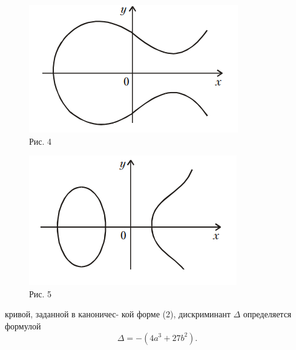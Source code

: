 \documentclass[a4paper]{article}
\begin{document}
\setcounter{page}{5}
\pagestyle{fancy}
\fancyhf{}
\fancyhead[R]{\large\thepage}
\renewcommand{\headrulewidth}{0pt}
\renewcommand{\arraystretch}{1.75}

\vspace*{-3.5\baselineskip}
\begin{multicols}{3}

\begin{figure}[H]
    \centering
    \includegraphics[width=\linewidth]{Рис.4.png}
    \caption*{Рис. 4}
\end{figure} 
\begin{figure}[H]
    \centering
    \includegraphics[width=\linewidth]{Рис.5.png}
    \caption*{Рис. 5}
\end{figure} 
 кривой, заданной в каноничес-
кой форме (2), дискриминант \(\Delta\) определяется формулой \[\Delta=-(4a^3+27b^2).\]


\end{multicols}
\end{document}
